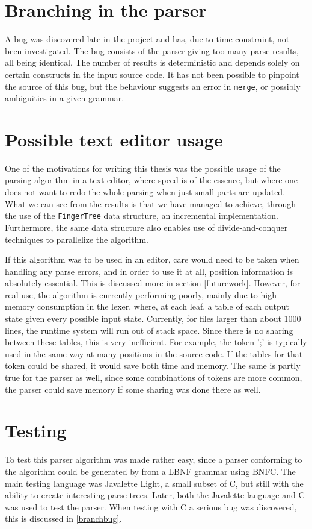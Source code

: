 \documentclass[a4paper,12pt,twosided]{report}
\begin{document}
\section{Branching in the parser}
A bug was discovered late in the project and has, due to time constraint, not
been investigated. The bug consists of the parser giving too many parse 
results, all being identical. The number of results is deterministic and depends
solely on certain constructs in the input source code. It has not been possible
to pinpoint the source of this bug, but the behaviour suggests an error in
\texttt{merge}, or possibly ambiguities in a given grammar. \label{branchbug}

\section{Possible text editor usage}
One of the motivations for writing this thesis was the possible usage of the
parsing algorithm in a text editor, where speed is of the essence, but where one
does not want to redo the whole parsing when just small parts are updated. What
we can see from the results is that we have managed to achieve, through the use
of the \texttt{FingerTree} data structure, an incremental implementation.
Furthermore, the same data structure also enables use of divide-and-conquer
techniques to parallelize the algorithm. 

If this algorithm was to be used in an editor, care would need to be taken when
handling any parse errors, and in order to use it at all, position information
is absolutely essential. This is discussed more in section \ref{futurework}.
However, for real use, the algorithm is currently performing poorly, mainly due
to high memory consumption in the lexer, where, at each leaf, a table of each
output state given every possible input state.  Currently, for files larger than
about 1000 lines, the runtime system will run out of stack space.  Since there
is no sharing between these tables, this is very inefficient. For example, the
token ';' is typically used in the same way at many positions in the source
code. If the tables for that token could be shared, it would save both time and
memory. The same is partly true for the parser as well, since some combinations
of tokens are more common, the parser could save memory if some sharing was done
there as well.

\section{Testing}
To test this parser algorithm was made rather easy, since a parser conforming to
the algorithm could be generated by from a LBNF grammar using BNFC. The main
testing language was Javalette Light, a small subset of C, but still with the
ability to create interesting parse trees. Later, both the Javalette language
and C was used to test the parser. When testing with C a serious bug was
discovered, this is discussed in \ref{branchbug}.
\end{document}
